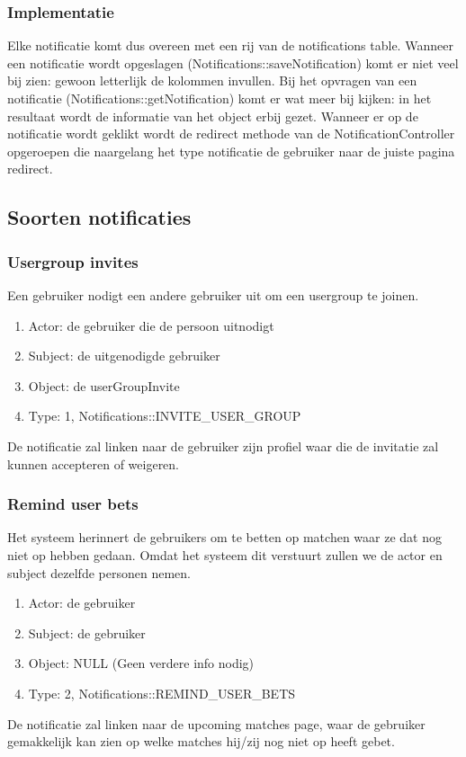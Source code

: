 \documentclass[11pt, a4paper]{article}
\begin{document}
\subsubsection{Implementatie}
Elke notificatie komt dus overeen met een rij van de notifications table. Wanneer een notificatie wordt opgeslagen (Notifications::saveNotification) komt er niet veel bij zien: gewoon letterlijk de kolommen invullen.
Bij het opvragen van een notificatie (Notifications::getNotification) komt er wat meer bij kijken: in het resultaat wordt de informatie van het object erbij gezet.
Wanneer er op de notificatie wordt geklikt wordt de redirect methode van de NotificationController opgeroepen die naargelang het type notificatie de gebruiker naar de juiste pagina redirect.

\subsection{Soorten notificaties}
\subsubsection{Usergroup invites}
Een gebruiker nodigt een andere gebruiker uit om een usergroup te joinen.
\begin{enumerate}
\item Actor: de gebruiker die de persoon uitnodigt
\item Subject: de uitgenodigde gebruiker
\item Object: de userGroupInvite
\item Type: 1, Notifications::INVITE\_USER\_GROUP
\end{enumerate}
De notificatie zal linken naar de gebruiker zijn profiel waar die de invitatie zal kunnen accepteren of weigeren.

\subsubsection{Remind user bets}
Het systeem herinnert de gebruikers om te betten op matchen waar ze dat nog niet op hebben gedaan.
Omdat het systeem dit verstuurt zullen we de actor en subject dezelfde personen nemen.
\begin{enumerate}
\item Actor: de gebruiker
\item Subject: de gebruiker
\item Object: NULL (Geen verdere info nodig)
\item Type: 2, Notifications::REMIND\_USER\_BETS
\end{enumerate}
De notificatie zal linken naar de upcoming matches page, waar de gebruiker gemakkelijk kan zien op welke matches hij/zij nog niet op heeft gebet.
\end{document}
